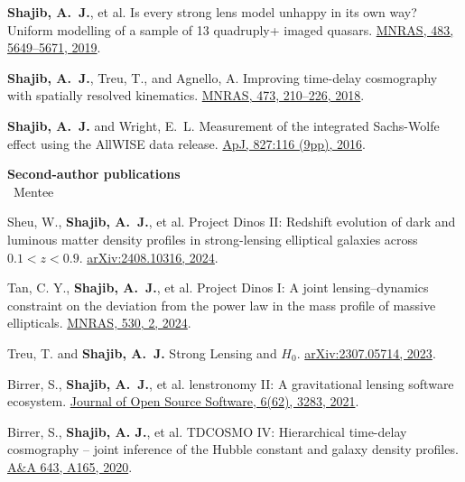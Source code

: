 \documentclass[margin, line]{res}
\begin{document}
\begin{resume}
\begin{etaremune}
	\item \textbf{Shajib, A.~J.}, et al. Is every strong lens model unhappy in its own way? Uniform modelling of a sample of 13 quadruply+ imaged quasars. \href{https://doi.org/10.1093/mnras/sty3397}{MNRAS, 483, 5649--5671, 2019}.
	\item \textbf{Shajib, A.~J.}, Treu, T., and Agnello, A. Improving time-delay cosmography with spatially resolved kinematics. \href{https://doi.org/10.1093/mnras/stx2302}{MNRAS, 473, 210--226, 2018}.
	\item \textbf{Shajib, A.~J.} and Wright, E.~L. Measurement of the integrated Sachs-Wolfe effect using the AllWISE data release. \href{http://dx.doi.org/10.3847/0004-637X/827/2/116}{ApJ, 827:116 (9pp), 2016}.
\end{etaremune}


\textbf{Second-author publications}
\\ \mentee\ Mentee
\begin{etaremune}
	\item Sheu, W.{\mentee},  \textbf{Shajib, A.~J.}, et al. Project Dinos II: Redshift evolution of dark and luminous matter density profiles in strong-lensing elliptical galaxies across  $0.1<z<0.9$. \href{https://ui.adsabs.harvard.edu/abs/2024arXiv240810316S/abstract}{arXiv:2408.10316, 2024}.
	\item Tan, C. Y.{\mentee}, \textbf{Shajib, A.~J.}, et al. Project Dinos I: A joint lensing--dynamics constraint on the deviation from the power law in the mass profile of massive ellipticals. \href{https://ui.adsabs.harvard.edu/abs/2023arXiv231109307T/abstract}{MNRAS, 530, 2, 2024}.
	\item Treu, T. and \textbf{Shajib, A.~J.} Strong Lensing and $H_0$. \href{https://arxiv.org/abs/2307.05714}{arXiv:2307.05714, 2023}.
	\item Birrer, S., \textbf{Shajib, A.~J.}, et al. lenstronomy II: A gravitational lensing software ecosystem. \href{https://joss.theoj.org/papers/10.21105/joss.03283}{Journal of Open Source Software, 6(62), 3283, 2021}.
	\item Birrer, S., \textbf{Shajib, A. J.}, et al. TDCOSMO IV: Hierarchical time-delay cosmography -- joint inference of the Hubble constant and galaxy density profiles. \href{https://doi.org/10.1051/0004-6361/202038861}{A\&A 643, A165, 2020}.
\end{etaremune}


\end{resume}
\end{document}

